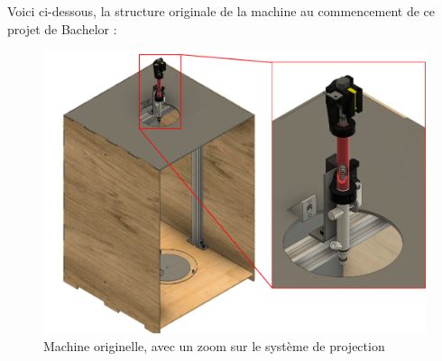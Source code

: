 Voici ci-dessous, la structure originale de la machine au commencement de ce projet de Bachelor :
\begin{figure}[H]
  \centering
  \includegraphics[width = \textwidth]{assets/figures/situation_initiale/machine_initiale.png}
  \caption[Machine originelle]{Machine originelle, avec un zoom sur le système de projection}
  \label{fig:Machine_originale}
\end{figure}

